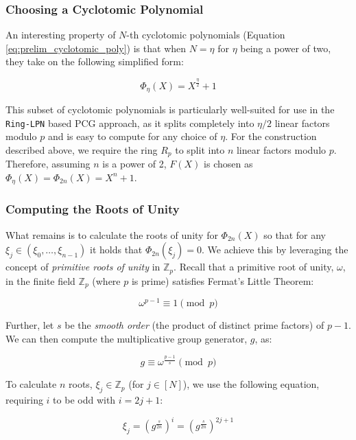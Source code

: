 \subsubsection{Choosing a Cyclotomic Polynomial}
An interesting property of $N$-th cyclotomic polynomials (Equation \ref{eq:prelim_cyclotomic_poly}) is that when $N=\eta$ for $\eta$ being a power of two, they take on the following simplified form:

\begin{equation}
\label{eq:choosingfx}
\Phi_\eta(X)= X^\frac{\eta}{2} + 1
\end{equation}

This subset of cyclotomic polynomials is particularly well-suited for use in the \texttt{Ring-LPN} based PCG approach, as it splits completely into $\eta/2$ linear factors modulo $p$ and is easy to compute for any choice of $\eta$. For the construction described above, we require the ring $R_p$ to split into $n$ linear factors modulo $p$. Therefore, assuming $n$ is a power of 2, $F(X)$ is chosen as $\Phi_\eta(X) = \Phi_{2n}(X) = X^n + 1$.


\subsubsection{Computing the Roots of Unity}
What remains is to calculate the roots of unity for $\Phi_{2n}(X)$ so that for any $\xi_j \in (\xi_0, \ldots, \xi_{n-1})$ it holds that $\Phi_{2n}(\xi_j) = 0$. We achieve this by leveraging the concept of \textit{primitive roots of unity} in $\mathbb{Z}_p$. Recall that a primitive root of unity, $\omega$, in the finite field  $\mathbb{Z}_p$ (where $p$ is prime) satisfies Fermat's Little Theorem:

\begin{equation}
\label{eq:fermatLT}
\omega^{p-1} \equiv 1 \pmod{p}
\end{equation}

Further, let $s$ be the \textit{smooth order} (the product of distinct prime factors) of $p-1$.  We can then compute the multiplicative group generator, $g$, as:

\begin{equation}
g \equiv \omega^{\frac{p-1}{s}} \pmod{p}
\label{eq:multGroupGen}
\end{equation}

To calculate $n$ roots, $\xi_j \in \mathbb{Z}_p$ (for $j \in [N]$), we use the following equation, requiring $i$ to be odd with $i=2j+1$:

\begin{equation}
\label{eq:root_main_equasion}
\xi_j = \left(g^{\frac{s}{2n}}\right)^{i} = \left(g^{\frac{s}{2n}}\right)^{2j+1}
\end{equation}

